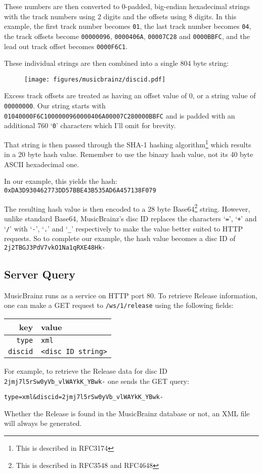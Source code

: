 These numbers are then converted to 0-padded, big-endian hexadecimal strings
with the track numbers using 2 digits and the offsets using 8 digits.
In this example, the first track number becomes \texttt{01},
the last track number becomes \texttt{04},
the track offsets become \texttt{00000096}, \texttt{0000406A},
\texttt{00007C28} and \texttt{0000BBFC},
and the lead out track offset becomes \texttt{0000F6C1}.

These individual strings are then combined into a single 804 byte string:
\begin{figure}[h]
\texttt{[image: figures/musicbrainz/discid.pdf]}
\end{figure}

Excess track offsets are treated as having an offset value of 0,
or a string value of \texttt{00000000}.
Our string starts with \texttt{01040000F6C1000000960000406A00007C280000BBFC}
and is padded with an additional 760 `\texttt{0}' characters
which I'll omit for brevity.

That string is then passed through the SHA-1 hashing algorithm\footnote{This is described in RFC3174}
which results in a 20 byte hash value.
Remember to use the binary hash value, not its 40 byte ASCII hexadecimal one.

In our example, this yields the hash:
\texttt{0xDA3D930462773DD57BBE43B535AD6A457138F079}

The resulting hash value is then encoded to a 28 byte Base64\footnote{This is described in RFC3548 and RFC4648} string.
However, unlike standard Base64, MusicBrainz's disc ID replaces the
characters `\texttt{=}', `\texttt{+}' and `\texttt{/}' with `\texttt{-}', `\texttt{.}' and `\texttt{\_}' respectively to
make the value better suited to HTTP requests.
So to complete our example, the hash value becomes a disc ID of
\texttt{2j2TBGJ3PdV7vkO1Na1qRXE48Hk-}

\pagebreak

\subsection{Server Query}
MusicBrainz runs as a service on HTTP port 80.
To retrieve Release information, one can make a GET request to
\texttt{/ws/1/release} using the following fields:
\begin{table}[h]
\begin{tabular}{|r|l|}
\hline
key & value \\
\hline
\texttt{type} & \texttt{xml} \\
\texttt{discid} & \texttt{<disc ID string>} \\
\hline
\end{tabular}
\end{table}
\par
\noindent
For example, to retrieve the Release data for disc ID
\texttt{2jmj7l5rSw0yVb\_vlWAYkK\_YBwk-} one sends the GET query:
\begin{Verbatim}[frame=single]
type=xml&discid=2jmj7l5rSw0yVb_vlWAYkK_YBwk-
\end{Verbatim}
Whether the Release is found in the MusicBrainz database or not,
an XML file will always be generated.

